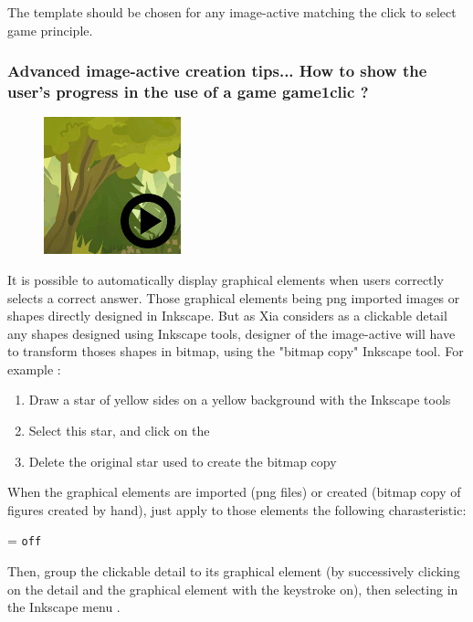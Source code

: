 The template  should be chosen for any image-active matching 
the click to select game principle.



\subsubsection{Advanced image-active creation tips... How to show the user's progress in the use of a game game1clic ?}\label{détail_progression}



\begin{figure}
  \centering
  \includegraphics[scale=0.7]{./images/game1clic} 
\end{figure}

It is possible to automatically display graphical elements when users correctly 
selects a correct answer. Those graphical elements being png imported images or 
shapes directly designed in Inkscape. But as Xia considers as a clickable 
detail any shapes designed using Inkscape tools, designer of the image-active 
will have to transform thoses shapes in bitmap, using the "bitmap copy" Inkscape tool. 
For example :
\begin{enumerate}
 \item Draw  a star of yellow sides on a yellow background with the  Inkscape tools 
 \item Select this star, and click on the 
 \item Delete the original star used to create the bitmap copy
\end{enumerate}

When the graphical elements are imported (png files) or created (bitmap copy 
of figures created by hand), just apply to those elements the following 
charasteristic:
\begin{center}
 = \verb|off|
\end{center}
Then, group the clickable detail to its graphical element (by successively 
clicking on the detail and the graphical element with the \Shift keystroke on),
then selecting  in the Inkscape menu .

